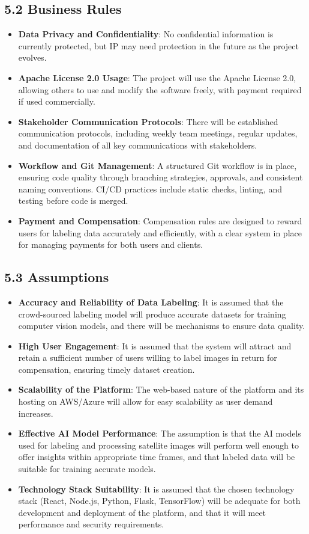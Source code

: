 \documentclass[12pt]{article}
\begin{document}
\subsection*{5.2 Business Rules}
\begin{itemize}[leftmargin=2cm]
    \item \textbf{Data Privacy and Confidentiality}: No confidential information is currently protected, but IP may need protection in the future as the project evolves.
    \item \textbf{Apache License 2.0 Usage}: The project will use the Apache License 2.0, allowing others to use and modify the software freely, with payment required if used commercially.
    \item \textbf{Stakeholder Communication Protocols}: There will be established communication protocols, including weekly team meetings, regular updates, and documentation of all key communications with stakeholders.
    \item \textbf{Workflow and Git Management}: A structured Git workflow is in place, ensuring code quality through branching strategies, approvals, and consistent naming conventions. CI/CD practices include static checks, linting, and testing before code is merged.
    \item \textbf{Payment and Compensation}: Compensation rules are designed to reward users for labeling data accurately and efficiently, with a clear system in place for managing payments for both users and clients.
\end{itemize}

\subsection*{5.3 Assumptions}
\begin{itemize}[leftmargin=2cm]
    \item \textbf{Accuracy and Reliability of Data Labeling}: It is assumed that the crowd-sourced labeling model will produce accurate datasets for training computer vision models, and there will be mechanisms to ensure data quality.
    \item \textbf{High User Engagement}: It is assumed that the system will attract and retain a sufficient number of users willing to label images in return for compensation, ensuring timely dataset creation.
    \item \textbf{Scalability of the Platform}: The web-based nature of the platform and its hosting on AWS/Azure will allow for easy scalability as user demand increases.
    \item \textbf{Effective AI Model Performance}: The assumption is that the AI models used for labeling and processing satellite images will perform well enough to offer insights within appropriate time frames, and that labeled data will be suitable for training accurate models.
    \item \textbf{Technology Stack Suitability}: It is assumed that the chosen technology stack (React, Node.js, Python, Flask, TensorFlow) will be adequate for both development and deployment of the platform, and that it will meet performance and security requirements.
\end{itemize}
\end{document}
